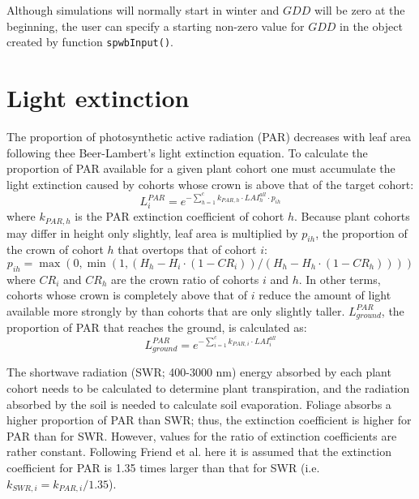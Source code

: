 \documentclass[]{book}
\begin{document}
Although simulations will normally start in winter and \(GDD\) will be zero at the beginning, the user can specify a starting non-zero value for \(GDD\) in the object created by function \texttt{spwbInput()}.

\hypertarget{light-extinction}{%
\section{Light extinction}\label{light-extinction}}

The proportion of photosynthetic active radiation (PAR) decreases with leaf area following thee Beer-Lambert's light extinction equation. To calculate the proportion of PAR available for a given plant cohort one must accumulate the light extinction caused by cohorts whose crown is above that of the target cohort:
\begin{equation}
L^{PAR}_i=e^{-\sum_{h=1}^{c}{k_{PAR,h} \cdot LAI_{h}^{all} \cdot p_{ih}}}
\end{equation}
where \(k_{PAR,h}\) is the PAR extinction coefficient of cohort \(h\). Because plant
cohorts may differ in height only slightly, leaf area is multiplied by \(p_{ih}\),
the proportion of the crown of cohort \(h\) that overtops that of cohort \(i\):
\begin{equation}
p_{ih}=\max(0,\min(1,(H_h-H_i\cdot (1 - CR_i))/(H_h-H_h\cdot (1 - CR_h))))
\end{equation}
where \(CR_i\) and \(CR_h\) are the crown ratio of cohorts \(i\) and \(h\). In other terms,
cohorts whose crown is completely above that of \(i\) reduce the amount of light
available more strongly by than cohorts that are only slightly taller.
\(L^{PAR}_{ground}\), the proportion of PAR that reaches the ground, is calculated as:
\begin{equation}
L^{PAR}_{ground}=e^{-\sum_{i=1}^{c}{k_{PAR,i} \cdot LAI_{i}^{all}}}
\end{equation}

The shortwave radiation (SWR; 400-3000 nm) energy absorbed by each plant cohort
needs to be calculated to determine plant transpiration, and the radiation absorbed
by the soil is needed to calculate soil evaporation. Foliage absorbs a higher
proportion of PAR than SWR; thus, the extinction coefficient is higher for PAR
than for SWR. However, values for the ratio of extinction coefficients are rather
constant. Following Friend et al. \citeyearpar{Friend1997} here it is assumed that the extinction
coefficient for PAR is 1.35 times larger than that for SWR (i.e.
\(k_{SWR,i} = k_{PAR,i}/1.35\)).
\end{document}
